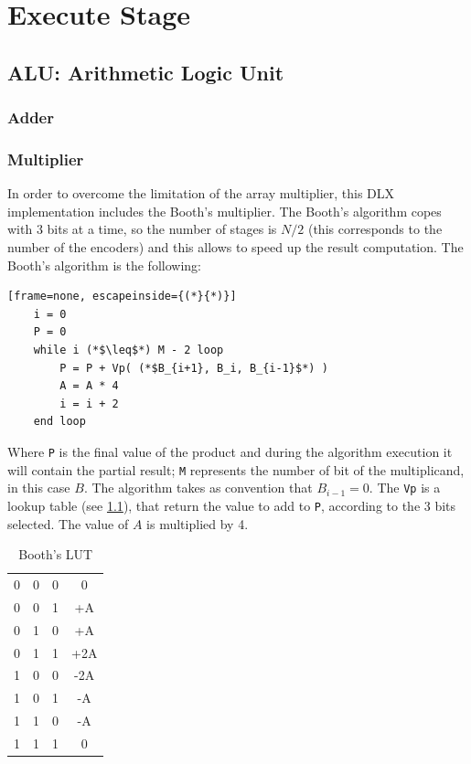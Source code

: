 \chapter{Execute Stage}

\section{ALU: Arithmetic Logic Unit}
\subsection{Adder}
\subsection{Multiplier}
In order to overcome the limitation of the array multiplier, this DLX implementation includes the Booth's multiplier. The Booth's algorithm copes with 3 bits at a time, so the number of stages is $N/2$ (this corresponds to the number of the encoders) and this allows to speed up the result computation. 
The Booth's algorithm is the following:
\begin{lstlisting}[frame=none, escapeinside={(*}{*)}]
	i = 0
	P = 0
	while i (*$\leq$*) M - 2 loop
		P = P + Vp( (*$B_{i+1}, B_i, B_{i-1}$*) )
		A = A * 4
		i = i + 2
	end loop
\end{lstlisting}
Where \texttt{P} is the final value of the product and during the algorithm execution it will contain the partial result; \texttt{M} represents the number of bit of the multiplicand, in this case $B$. The algorithm takes as convention that $B_{i-1} = 0$. The \texttt{Vp} is a lookup table (see \ref{mult:lut}), that return the value to add to \texttt{P}, according to the 3 bits selected. The value of $A$ is multiplied by 4.

\begin{table}
	\begin{center}
		\begin{tabular}{ c c c | c}
			0 & 0 & 0 & 0\\ 
			0 & 0 & 1 & +A\\ 
			0 & 1 & 0 & +A\\ 
			0 & 1 & 1 & +2A\\ 
			1 & 0 & 0 & -2A\\ 
			1 & 0 & 1 & -A\\ 
			1 & 1 & 0 & -A\\ 
			1 & 1 & 1 & 0\\ 
		\end{tabular}
		\caption{Booth's LUT}
		\label{mult:lut}
	\end{center}
\end{table}

